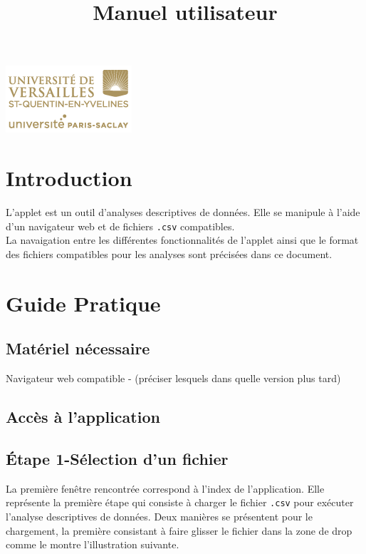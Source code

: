 

\title{\vspace{\fill}\textbf{\Huge Manuel utilisateur}}


\clearpage
\maketitle\vspace{9em}
\begin{center}\includegraphics[scale=0.7]{../Cahier/logo.png}\end{center}
\newpage
\tableofcontents
\newpage\clearpage{}

\section{Introduction}
	L'applet est un outil d'analyses descriptives de données. Elle se manipule à l'aide d'un navigateur web et de fichiers \lstinline!.csv! compatibles.\\
	La navaigation entre les différentes fonctionnalités de l'applet ainsi que le format des fichiers compatibles pour les analyses sont précisées dans ce document.
	
\section{Guide Pratique}
	\subsection{Matériel nécessaire}
		Navigateur web compatible - (préciser lesquels dans quelle version plus tard)
	\subsection{Accès à l'application}
	\subsection{Étape 1-Sélection d'un fichier}
		La première fenêtre rencontrée correspond à l'index de l'application. Elle représente la première étape qui consiste à charger le fichier \lstinline!.csv! pour exécuter l'analyse descriptives de données. 
		Deux manières se présentent pour le chargement, la première consistant à faire glisser le fichier dans la zone de drop comme le montre l'illustration suivante. \\
		
